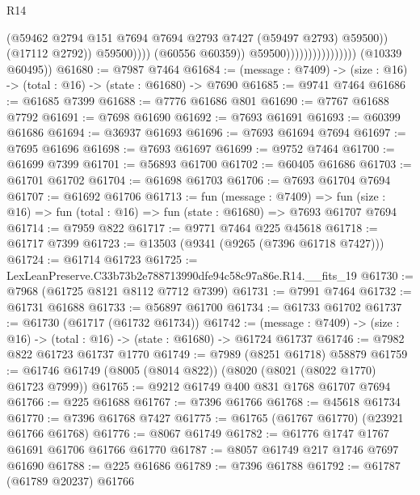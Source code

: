\begin{lexlean}{R14}
\begin{coremodule}
                                                    (@59462
                                                      @2794
                                                      @151
                                                      @7694
                                                      @7694
                                                      @2793
                                                      @7427
                                                      (@59497 @2793)
                                                      @59500))
                                                  (@17112 @2792))
                                                @59500))))
                                        (@60556 @60359))
                                      @59500))))))))))))))))
      (@10339 @60495))
@61680 := @7987 @7464
@61684 := (message : @7409) -> (size : @16) -> (total : @16) -> (state : @61680) -> @7690
@61685 := @9741 @7464
@61686 := @61685 @7399
@61688 := @7776 @61686 @801
@61690 := @7767 @61688 @7792
@61691 := @7698 @61690
@61692 := @7693 @61691
@61693 := @60399 @61686
@61694 := @36937 @61693
@61696 := @7693 @61694 @7694
@61697 := @7695 @61696
@61698 := @7693 @61697
@61699 := @9752 @7464
@61700 := @61699 @7399
@61701 := @56893 @61700
@61702 := @60405 @61686
@61703 := @61701 @61702
@61704 := @61698 @61703
@61706 := @7693 @61704 @7694
@61707 := @61692 @61706
@61713 := fun (message : @7409) =>
  fun (size : @16) => fun (total : @16) => fun (state : @61680) => @7693 @61707 @7694
@61714 := @7959 @822
@61717 := @9771 @7464 @225 @45618
@61718 := @61717 @7399
@61723 := @13503 (@9341 (@9265 (@7396 @61718 @7427)))
@61724 := @61714 @61723
@61725 := LexLeanPreserve.C33b73b2e788713990dfe94c58c97a86e.R14.__fits_19
@61730 := @7968 (@61725 @8121 @8112 @7712 @7399)
@61731 := @7991 @7464
@61732 := @61731 @61688
@61733 := @56897 @61700
@61734 := @61733 @61702
@61737 := @61730 (@61717 (@61732 @61734))
@61742 := (message : @7409) -> (size : @16) -> (total : @16) -> (state : @61680) -> @61724 @61737
@61746 := @7982 @822 @61723 @61737 @1770
@61749 := @7989 (@8251 @61718) @58879
@61759 := @61746 @61749 (@8005 (@8014 @822)) (@8020 (@8021 (@8022 @1770) @61723 @7999))
@61765 := @9212 @61749 @400 @831 @1768 @61707 @7694
@61766 := @225 @61688
@61767 := @7396 @61766
@61768 := @45618 @61734
@61770 := @7396 @61768 @7427
@61775 := @61765 (@61767 @61770) (@23921 @61766 @61768)
@61776 := @8067 @61749
@61782 := @61776 @1747 @1767 @61691 @61706 @61766 @61770
@61787 := @8057 @61749 @217 @1746 @7697 @61690
@61788 := @225 @61686
@61789 := @7396 @61788
@61792 := @61787 (@61789 @20237) @61766

\end{coremodule}
\end{lexlean}
